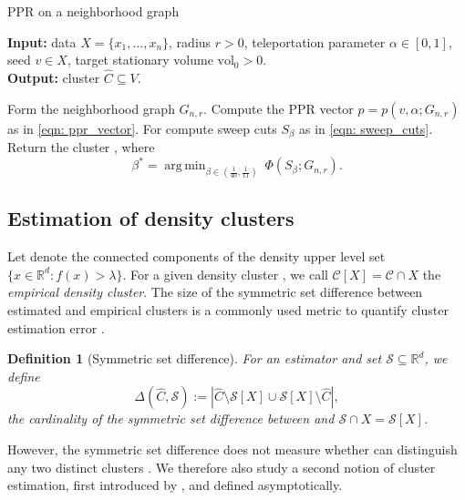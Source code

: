 \documentclass[11pt,twoside]{article}
\newtheorem{definition}{Definition}
\newcommand{\vol}{\mathrm{vol}}
\newcommand{\abs}[1]{\left \lvert #1 \right \rvert}
\newcommand{\Reals}{\mathbb{R}}
\newcommand{\Rd}{\Reals^d}
\newcommand{\1}{\mathbf{1}}
\newcommand{\pbf}{p}        %
\newcommand{\Xbf}{X}             %
\newcommand{\Cbb}{\mathbb{C}}
\newcommand{\Cset}{\mathcal{C}}
\newcommand{\Cest}{\widehat{C}}
\DeclareMathOperator*{\argmin}{arg\,min}
\begin{document}
\begin{algorithm}
\caption{PPR on a neighborhood graph}
\label{alg: ppr}	
{\bfseries Input:} data $\Xbf=\{x_1,\ldots,x_n\}$, radius $r > 0$, teleportation
parameter $\alpha \in [0,1]$, seed $v \in \Xbf$, target stationary volume
$\vol_0 > 0$. \\     
{\bfseries Output:} cluster $\Cest \subseteq V$.
\begin{algorithmic}[1]
  \STATE Form the neighborhood graph $G_{n,r}$.
  \STATE Compute the PPR vector $p=\pbf(v, \alpha; G_{n,r})$ as in \eqref{eqn: 
    ppr_vector}. 
  \STATE For  compute sweep cuts 
  $S_{\beta}$ as in \eqref{eqn: sweep_cuts}.
  \STATE Return the cluster \smash{$\Cest = S_{\beta^*}$}, where  
  $$
  \beta^* = \argmin_{\beta \in (\frac{1}{40}, \frac{1}{11})}~ \Phi(S_{\beta}; G_{n,r}).
  $$
\end{algorithmic}
\end{algorithm}

\subsection{Estimation of density clusters} 
Let \smash{$\Cbb_f(\lambda)$} denote 
the connected components of the density upper level set $\{x \in \Rd: f(x) >
\lambda\}$.  For a given density cluster \smash{$\Cset \in \Cbb_f(\lambda)$}, we
call $\Cset[\Xbf] = \Cset \cap \Xbf$ the \emph{empirical density cluster}. The
size of the symmetric set difference between estimated and empirical clusters is 
a commonly used metric to quantify cluster estimation error
\citep{korostelev1993,polonik1995,rigollet2009}.  

\begin{definition}[Symmetric set difference]
  \label{def: symmetric_set_diff}
  For an estimator \smash{$\Cest \subseteq \Xbf$} and set
  $\mathcal{S} \subseteq \Reals^d$, we define   
  \begin{equation}
    \label{eqn: misclassification_rate}
    \Delta(\Cest, \mathcal{S}) := \abs{\Cest \setminus \mathcal{S}[\Xbf] \cup
      \mathcal{S}[\Xbf] \setminus \Cest},
  \end{equation}
  the cardinality of the symmetric set difference between 
  \smash{$\Cest$} and $\mathcal{S} \cap \Xbf = \mathcal{S}[\Xbf]$. 
\end{definition}

However, the symmetric set difference does not measure whether \smash{$\Cest$} 
can distinguish any two distinct clusters \smash{$\Cset,\Cset' \in
  \Cbb_f(\lambda)$}. We therefore also study a second notion of cluster
estimation, first introduced by \citet{hartigan1981}, and defined
asymptotically. 
\end{document}
